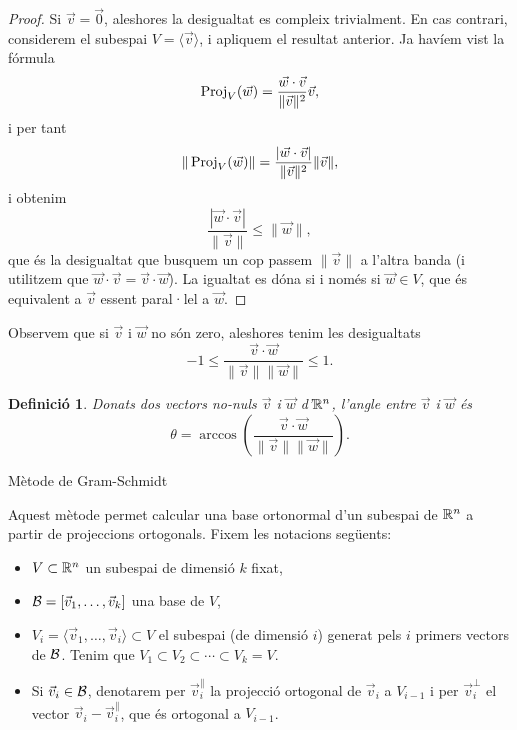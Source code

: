 \documentclass[
  11pt,
]{book}
\makeatletter
\numberwithin{dummy}{section}
\theoremstyle{maincolornumbox}
\theoremstyle{blacknumex}
\theoremstyle{blacknumbox}
\newtheorem{definitionT}{Definició}[chapter]
\theoremstyle{maincolornum}
\newenvironment{definition}{\begin{dBox}\begin{definitionT}}{\end{definitionT}\end{dBox}}
\renewcommand{\section}{\@startsection{section}{1}{\z@}
{-4ex \@plus -1ex \@minus -.4ex}
{1ex \@plus.2ex }
{\normalfont\large\sffamily\bfseries}}
\newlength\esp
\makeatother
\begin{document}
\begin{proof}
Si \(\vec v=\vec 0\), aleshores la desigualtat es compleix
trivialment. En cas contrari, considerem el subespai
\(V=\langle \vec v\rangle\), i apliquem el resultat anterior. Ja havíem
vist la fórmula
\[\operatorname{Proj}_V(\vec w) = \frac{\vec w\cdot \vec v}{\|\vec v\|^2} \vec v,\] i
per tant
\[\|\operatorname{Proj}_V(\vec w)\| = \frac{|\vec w\cdot \vec v|}{\|\vec v\|^2} \|\vec v\|,\]
i obtenim \[\frac{|\vec w\cdot \vec v|}{\|\vec v\|} \leq \|\vec w\|,\]
que és la desigualtat que busquem un cop passem \(\|\vec v\|\) a l'altra
banda (i utilitzem que \(\vec w\cdot \vec v=\vec v\cdot \vec w\)). La
igualtat es dóna si i només si \(\vec w\in V\), que és equivalent a
\(\vec v\) essent paral·lel a \(\vec w\).
\end{proof}

Observem que si \(\vec v\) i \(\vec w\) no són zero, aleshores tenim les
desigualtats
\[-1 \leq \frac{\vec v\cdot \vec w}{\|\vec v\|\|\vec w\|}\leq 1.\]

\begin{definition}
Donats dos vectors no-nuls \(\vec v\) i \(\vec w\) d'\(\mathbb{R}^n\), \emph{l'angle entre
\(\vec v\) i \(\vec w\)} és
\[\theta = \arccos\left(\frac{\vec v\cdot \vec w}{\|\vec v\|\|\vec w\|}\right).\]
\end{definition}

\section{Mètode de Gram-Schmidt}\label{muxe8tode-de-gram-schmidt}

Aquest mètode permet calcular una base ortonormal d'un subespai de
\(\mathbb{R}^n\) a partir de projeccions ortogonals. Fixem les notacions següents:

\begin{itemize}
\item
  \(V\subset \mathbb{R}^n\) un subespai de dimensió \(k\) fixat,
\item
  \(\mathcal{B} =[\vec v_1, \dots , \vec v_k]\) una base de \(V\),
\item
  \(V_i=\langle \vec v_1, \dots , \vec v_i\rangle \subset V\) el
  subespai (de dimensió \(i\)) generat pels \(i\) primers vectors de
  \(\mathcal{B}\). Tenim que \(V_1\subset V_2\subset \cdots \subset V_k=V\).
\item
  Si \(\vec v_i\in\mathcal{B}\), denotarem per \(\vec v_i^\parallel\) la
  projecció ortogonal de \(\vec v_i\) a \(V_{i-1}\) i per \(\vec v_i^\perp\)
  el vector \(\vec v_i - \vec v_i^\parallel\), que és ortogonal a
  \(V_{i-1}\).
\end{itemize}
\end{document}

